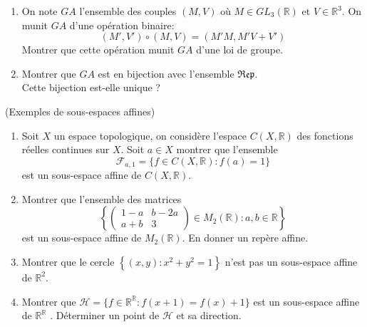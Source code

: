 \documentclass[a4paper,12pt,reqno]{amsart}
\begin{document}
\begin{exo}
\begin{enumerate}
    \item\hard On note $GA$ l'ensemble des couples $(M,V)$ où $M\in GL_{3}(\mathbb{R})$ et $V\in\mathbb{R}^{3}$. On munit $GA$ d'une opération binaire:\vspace{-3mm}
      \[
        (M',V')\circ(M,V)=(M'M,M'V+V')
      \]
    Montrer que cette opération munit $GA$ d'une loi de groupe.

    \item\hard Montrer que $GA$ est en bijection avec l'ensemble $\mathfrak{Rep}$. \\
    Cette bijection est-elle unique ?
  \end{enumerate}
\end{exo}

\begin{exo} (Exemples de sous-espaces affines)
  \begin{enumerate}

  \item Soit $X$ un espace topologique, on considère l'espace $C(X,\mathbb{R})$ des fonctions réelles continues sur $X$. Soit $a \in X$ montrer que l'ensemble
    \[
      \mathcal{F}_{a,1}=\{ f \in C(X,\mathbb{R}) : f(a)=1 \}
    \]
  est un sous-espace affine de $C(X,\mathbb{R})$.

  \item Montrer que l'ensemble des matrices
    \[
      \left\{
        \left(
          \begin{array}{cc}
            1-a & b-2a\\
            a+b & 3
          \end{array}
        \right) \in M_{2}(\mathbb{R})
        : a,b \in \mathbb{R}
      \right\}
    \]
  est un sous-espace affine de $M_{2}(\mathbb{R})$. En donner un repère affine.

  \item Montrer que le cercle $\left\{ (x,y) : x^{2}+y^{2} = 1 \right\} $ n'est
  pas un sous-espace affine de $\mathbb{R}^{2}$.

  \item Montrer que $\mathcal{H} = \{ f \in \mathbb{R}^{\mathbb{R}} : f(x+1)=f(x)+1\}$
  est un sous-espace affine de $\mathbb{R}^{\mathbb{R}}$ . Déterminer
  un point de $\mathcal{H}$ et sa direction.
  \end{enumerate}
\end{exo}
\end{document}
